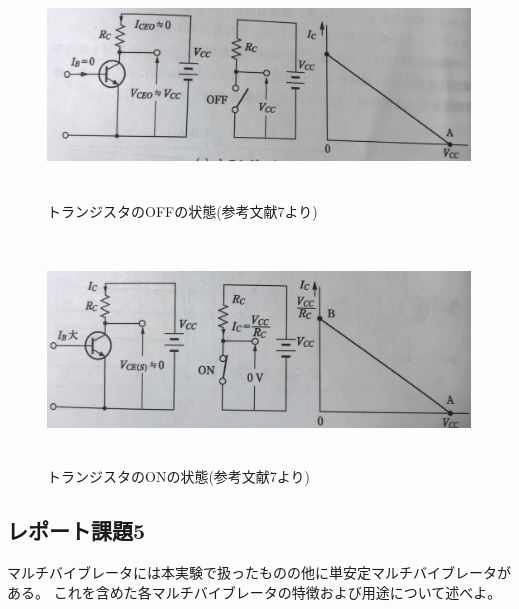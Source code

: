 \documentclass[12pt]{jarticle}
\begin{document}
\begin{figure}[h]
    \begin{center}
        \includegraphics[bb=0 0 2818 1013,height=6cm]{parusu_10.jpg}
    \end{center}
    \caption{トランジスタのOFFの状態(参考文献7より)}
    \label{fig10}
\end{figure}
\begin{figure}[h]
    \begin{center}
        \includegraphics[bb=0 0 2812 1045,height=6cm]{parusu_11.jpg}
    \end{center}
    \caption{トランジスタのONの状態(参考文献7より)}
    \label{fig11}
\end{figure}

\clearpage
\subsection{レポート課題5}
\begin{shadebox}
    マルチバイブレータには本実験で扱ったものの他に単安定マルチバイブレータがある。
    これを含めた各マルチバイブレータの特徴および用途について述べよ。
\end{shadebox}
\end{document}
